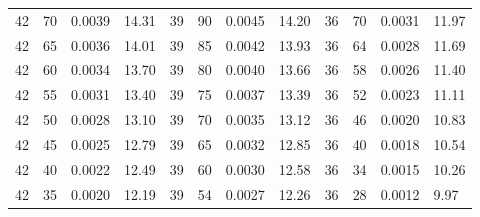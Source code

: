 \begin{tabular}{llll|llll|llll}
42 & 70 & 0.0039 & 14.31 & 39 & 90 & 0.0045 & 14.20 & 36 & 70 & 0.0031 & 11.97\\
42 & 65 & 0.0036 & 14.01 & 39 & 85 & 0.0042 & 13.93 & 36 & 64 & 0.0028 & 11.69\\
42 & 60 & 0.0034 & 13.70 & 39 & 80 & 0.0040 & 13.66 & 36 & 58 & 0.0026 & 11.40\\
42 & 55 & 0.0031 & 13.40 & 39 & 75 & 0.0037 & 13.39 & 36 & 52 & 0.0023 & 11.11\\
42 & 50 & 0.0028 & 13.10 & 39 & 70 & 0.0035 & 13.12 & 36 & 46 & 0.0020 & 10.83\\
42 & 45 & 0.0025 & 12.79 & 39 & 65 & 0.0032 & 12.85 & 36 & 40 & 0.0018 & 10.54\\
42 & 40 & 0.0022 & 12.49 & 39 & 60 & 0.0030 & 12.58 & 36 & 34 & 0.0015 & 10.26\\
42 & 35 & 0.0020 & 12.19 & 39 & 54 & 0.0027 & 12.26 & 36 & 28 & 0.0012 & 9.97\\
\bottomrule
\end{tabular}
\newpage
